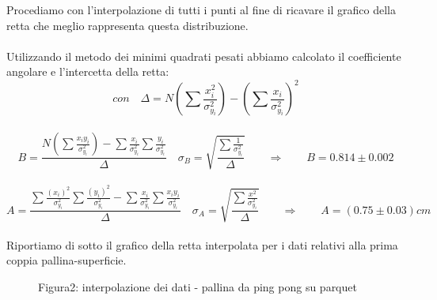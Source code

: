 \documentclass[a4paper]{article}
\theoremstyle{definition}
\begin{document}
	\noindent Procediamo con l'interpolazione di tutti i punti al fine di ricavare il grafico della retta che meglio rappresenta questa distribuzione.\\\\
	Utilizzando il metodo dei minimi quadrati pesati abbiamo calcolato il coefficiente angolare e l'intercetta della retta:\\
	\[ con\quad\Delta = N(\sum \frac{x_{i}^{2}}{\sigma _{y_{i}}^{2}})-(\sum \frac{x_{i}}{\sigma _{y_{i}}^{2}})^{2}\]\\
	\[B = \frac{N(\sum\frac{x_{i}y_{i}}{\sigma _{y_{i}}^{2}})-\sum\frac{x_{i}}{\sigma _{y_{i}}^{2}}\sum\frac{y_{i}}{\sigma _{y_{i}}^{2}}}{\Delta } \quad
	\sigma _{B} = \sqrt{\frac{\sum \frac{1}{\sigma _{y_{i}}^{2}}}{\Delta}} \qquad
	\Rightarrow \qquad B = 0.814 \pm 0.002\]\\
	\[A = \frac{\sum \frac{(x_{i})^{2}}{\sigma _{y_{i}}^{2}}\sum \frac{(y_{i})^{2}}{\sigma _{y_{i}}^{2}}-\sum \frac{x_{i}}{\sigma _{y_{i}}^{2}}\sum \frac{x_{i}y_{i}}{\sigma _{y_{i}}^{2}}}{\Delta} \quad  \sigma _{A} = \sqrt{\frac{\sum \frac{x^{2}}{\sigma _{y_{i}}^{2}}}{\Delta}} \qquad \Rightarrow \qquad A = (0.75 \pm 0.03) cm\]\\
	\noindent Riportiamo di sotto il grafico della retta interpolata per i dati relativi alla prima coppia pallina-superficie.
	\begin{figure}[!ht]
		\captionsetup{labelformat = empty}
		\caption{Figura2: interpolazione dei dati - pallina da ping pong su parquet}
	\end{figure}
	
\end{document}
